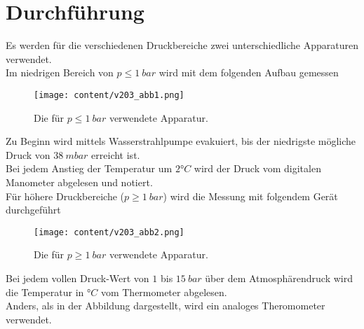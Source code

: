 \section{Durchführung}
\label{sec:Durchführung}

Es werden für die verschiedenen Druckbereiche zwei unterschiedliche Apparaturen verwendet. \\
Im niedrigen Bereich von $p \leqslant 1\:bar$ wird mit dem folgenden Aufbau gemessen

\begin{figure}[H]
    \centering
    \texttt{[image: content/v203\_abb1.png]}
    \caption{Die für $p \leqslant 1\:bar$ verwendete Apparatur. \cite{sample}}
    \label{abb:niedrigdruck}
\end{figure}
\noindent Zu Beginn wird mittels Wasserstrahlpumpe evakuiert, bis der niedrigste mögliche Druck von $38\:mbar$ erreicht ist.\\ %

\noindent Bei jedem Anstieg der Temperatur um $2°C$ wird der Druck vom digitalen Manometer abgelesen und notiert.\\


\noindent Für höhere Druckbereiche ($p \geqslant 1\:bar$) wird die Messung mit folgendem Gerät durchgeführt

\begin{figure}[H]
    \centering
    \texttt{[image: content/v203\_abb2.png]}
    \caption{Die für $p \geqslant 1\:bar$ verwendete Apparatur. \cite{sample}}
    \label{abb:hoherdruck}
\end{figure}

\noindent Bei jedem vollen Druck-Wert von $1$ bis $15\:bar$ über dem Atmosphärendruck wird die Temperatur in $°C$ vom Thermometer abgelesen.\\
Anders, als in der Abbildung dargestellt, wird ein analoges Theromometer verwendet.\\